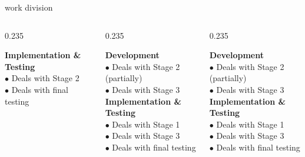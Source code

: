\documentclass[10pt]{beamer}
\begin{document}
\begin{frame}{work division}
\begin{columns}[T]
\begin{column}{0.235\textwidth}
\begin{tcolorbox}[colback=cardbg,colframe=bordergray,arc=2.5mm,boxrule=1pt,top=6mm,bottom=6mm,left=4mm,right=4mm]
            {\fontsize{9}{12}\selectfont \textbf{\color{brandred} Implementation \& Testing}}\\[0.15cm]
            {\fontsize{8}{11}\selectfont $\bullet$ Deals with Stage 2}\\[0.08cm]
            {\fontsize{8}{11}\selectfont $\bullet$ Deals with final testing}
        \end{tcolorbox}
    \end{column}%
    \begin{column}{0.235\textwidth}
        \begin{tcolorbox}[colback=cardbg,colframe=bordergray,arc=2.5mm,boxrule=1pt,top=6mm,bottom=6mm,left=4mm,right=4mm]
            {\fontsize{9}{12}\selectfont \textbf{\color{brandorange} Development}}\\[0.15cm]
            {\fontsize{8}{11}\selectfont $\bullet$ Deals with Stage 2 (partially)}\\[0.08cm]
            {\fontsize{8}{11}\selectfont $\bullet$ Deals with Stage 3}\\[0.55cm]
            {\fontsize{9}{12}\selectfont \textbf{\color{brandred} Implementation \& Testing}}\\[0.15cm]
            {\fontsize{8}{11}\selectfont $\bullet$ Deals with Stage 1}\\[0.08cm]
            {\fontsize{8}{11}\selectfont $\bullet$ Deals with Stage 3}\\[0.08cm]
            {\fontsize{8}{11}\selectfont $\bullet$ Deals with final testing}
        \end{tcolorbox}
    \end{column}%
    \begin{column}{0.235\textwidth}
        \begin{tcolorbox}[colback=cardbg,colframe=bordergray,arc=2.5mm,boxrule=1pt,top=6mm,bottom=6mm,left=4mm,right=4mm]
            {\fontsize{9}{12}\selectfont \textbf{\color{brandorange} Development}}\\[0.15cm]
            {\fontsize{8}{11}\selectfont $\bullet$ Deals with Stage 2 (partially)}\\[0.08cm]
            {\fontsize{8}{11}\selectfont $\bullet$ Deals with Stage 3}\\[0.55cm]
            {\fontsize{9}{12}\selectfont \textbf{\color{brandred} Implementation \& Testing}}\\[0.15cm]
            {\fontsize{8}{11}\selectfont $\bullet$ Deals with Stage 1}\\[0.08cm]
            {\fontsize{8}{11}\selectfont $\bullet$ Deals with Stage 3}\\[0.08cm]
            {\fontsize{8}{11}\selectfont $\bullet$ Deals with final testing}
        \end{tcolorbox}
    \end{column}
\end{columns}
\end{frame}
\end{document}
